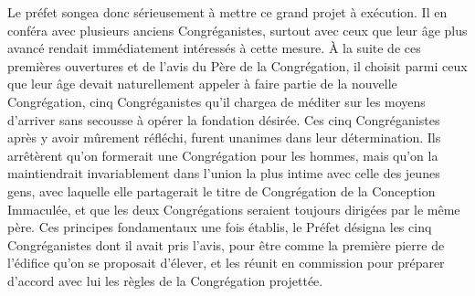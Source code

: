Le préfet songea donc sérieusement à mettre ce grand projet à exécution. Il en conféra avec plusieurs anciens Congréganistes, surtout avec ceux que leur âge plus avancé rendait immédiatement intéressés à cette mesure. À la suite de ces premières ouvertures et de l'avis du Père de la Congrégation, il choisit parmi ceux que leur âge devait naturellement appeler à faire partie de la nouvelle Congrégation, cinq Congréganistes qu'il chargea de méditer sur les moyens d'arriver sans secousse à opérer la fondation désirée. Ces cinq Congréganistes après y avoir mûrement réfléchi, furent unanimes dans leur détermination. Ils arrêtèrent qu'on formerait une Congrégation pour les hommes, mais qu'on la maintiendrait invariablement dans l'union la plus intime avec celle des jeunes gens, avec laquelle elle partagerait le titre de Congrégation de la Conception Immaculée, et que les deux Congrégations seraient toujours dirigées par le même père. Ces principes fondamentaux une fois établis, le Préfet désigna les cinq Congréganistes dont il avait pris l'avis, pour être comme la première pierre de l'édifice qu'on se proposait d'élever, et les réunit en commission pour préparer d'accord avec lui les règles de la Congrégation projettée.


